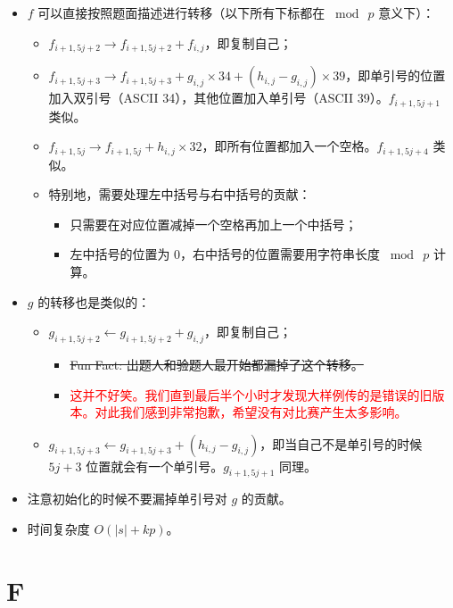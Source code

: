 \documentclass[9pt]{ctexbeamer}
\newcommand{\setParDis}{\setlength{\parskip}{6pt}}
\begin{document}
\begin{frame}
\setParDis

\begin{itemize}
	\item $f$ 可以直接按照题面描述进行转移（以下所有下标都在 $\bmod ~ p$ 意义下）：
		\begin{itemize}
			\item $f_{i+1,5j+2} \to f_{i+1,5j+2}+f_{i,j}$，即复制自己；
			\item $f_{i+1,5j+3} \to f_{i+1,5j+3}+g_{i,j} \times 34 + (h_{i,j}-g_{i,j}) \times 39$，即单引号的位置加入双引号（ASCII 34），其他位置加入单引号（ASCII 39）。$f_{i+1,5j+1}$ 类似。
			\item $f_{i+1,5j} \to f_{i+1,5j} + h_{i,j} \times 32$，即所有位置都加入一个空格。$f_{i+1,5j+4}$ 类似。
			\item 特别地，需要处理左中括号与右中括号的贡献：
				\begin{itemize}
					\item 只需要在对应位置减掉一个空格再加上一个中括号；
					\item 左中括号的位置为 $0$，右中括号的位置需要用字符串长度 $\bmod ~ p$ 计算。
				\end{itemize}
		\end{itemize}
	\item $g$ 的转移也是类似的：
		\begin{itemize}
			\item $g_{i+1,5j+2} \leftarrow g_{i+1,5j+2} + g_{i,j}$，即复制自己；
				\begin{itemize}
					\item \sout{Fun Fact: 出题人和验题人最开始都漏掉了这个转移。}
					\item \textcolor{red}{这并不好笑。我们直到最后半个小时才发现大样例传的是错误的旧版本。对此我们感到非常抱歉，希望没有对比赛产生太多影响。}
				\end{itemize}
			\item $g_{i+1,5j+3} \leftarrow g_{i+1,5j+3} + (h_{i,j}-g_{i,j})$，即当自己不是单引号的时候 $5j+3$ 位置就会有一个单引号。$g_{i+1,5j+1}$ 同理。
		\end{itemize}
	\item 注意初始化的时候不要漏掉单引号对 $g$ 的贡献。
	\item 时间复杂度 $O(\lvert s \rvert + kp)$。
\end{itemize}

\end{frame}

\section{F}
\end{document}
